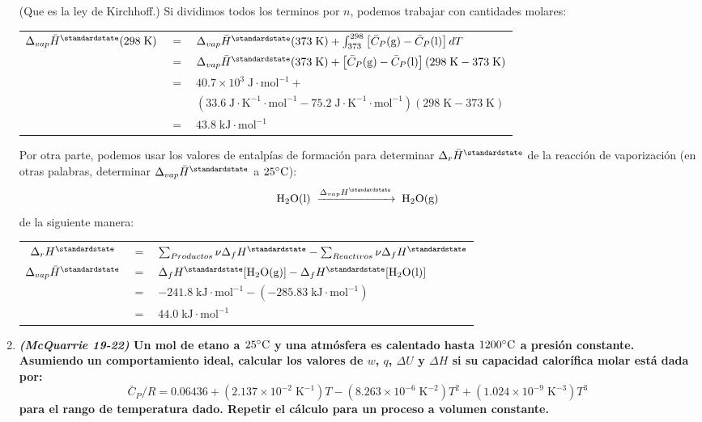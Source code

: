 \documentclass[a4paper,12pt]{article}
\begin{document}
\begin{enumerate}
(Que es la ley de Kirchhoff.) Si dividimos todos los terminos por $n$, podemos trabajar con cantidades molares:

\begin{tabular}{r c l}
$\Delta_{vap}\bar{H}^\standardstate(298\;\mbox{K})$ & $=$ & $\Delta_{vap}\bar{H}^\standardstate(373\;\mbox{K})+\int_{373}^{298}\left[\bar{C}_P\mbox{(g)}-\bar{C}_P\mbox{(l)}\right]dT$ \\
& $=$ & $\Delta_{vap}\bar{H}^\standardstate(373\;\mbox{K})+\left[\bar{C}_P\mbox{(g)}-\bar{C}_P\mbox{(l)}\right](298\;\mbox{K}-373\;\mbox{K})$ \\
& $=$ & $40.7\times 10^3\;\mbox{J}\cdot\mbox{mol}^{-1}+$ \\
& & $\left(33.6\;\mbox{J}\cdot\mbox{K}^{-1}\cdot\mbox{mol}^{-1}-75.2\;\mbox{J}\cdot\mbox{K}^{-1}\cdot\mbox{mol}^{-1}\right)(298\;\mbox{K}-373\;\mbox{K})$ \\
& $=$ & $43.8\;\mbox{kJ}\cdot\mbox{mol}^{-1}$
\end{tabular}

Por otra parte, podemos usar los valores de entalp\'ias de formaci\'on para determinar $\Delta_r\bar{H}^\standardstate$ de la reacci\'on de vaporizaci\'on (en otras palabras, determinar $\Delta_{vap}\bar{H}^\standardstate$ a $25\celsius$):
$$\mbox{H}_2\mbox{O(l)}\;\xrightarrow{\Delta_{vap}H^\standardstate}\;\mbox{H}_2\mbox{O(g)}$$
de la siguiente manera:
\begin{center}
\begin{tabular}{c c l}
$\Delta_{r} H^\standardstate$ & $=$ & $\sum_{Productos}\nu \Delta_{f}H^\standardstate-\sum_{Reactivos}\nu\Delta_{f}H^\standardstate$ \\
$\Delta_{vap}\bar{H}^\standardstate$ & $=$ & $\Delta_{f}H^\standardstate[\mbox{H}_2\mbox{O(g)}]-\Delta_{f}H^\standardstate[\mbox{H}_2\mbox{O(l)}]$ \\
& $=$ & $-241.8\;\mbox{kJ}\cdot\mbox{mol}^{-1}-(-285.83\;\mbox{kJ}\cdot\mbox{mol}^{-1})$ \\
& $=$ & $44.0\;\mbox{kJ}\cdot\mbox{mol}^{-1}$
\end{tabular}
\end{center}

 \item \textbf{\textit{(McQuarrie 19-22)} Un mol de etano a $25\celsius$ y una atm\'osfera es calentado hasta $1200\celsius$ a presi\'on constante. Asumiendo un comportamiento ideal, calcular los valores de $w$, $q$, $\Delta U$ y $\Delta H$ si su capacidad calor\'ifica molar est\'a dada por:
$$\bar{C}_P/R=0.06436+(2.137\times 10^{-2}\;\mbox{K}^{-1})T-(8.263\times 10^{-6}\;\mbox{K}^{-2})T^2+(1.024\times 10^{-9}\;\mbox{K}^{-3})T^3$$
para el rango de temperatura dado. Repetir el c\'alculo para un proceso a volumen constante.} %


\end{enumerate}
\end{document}
